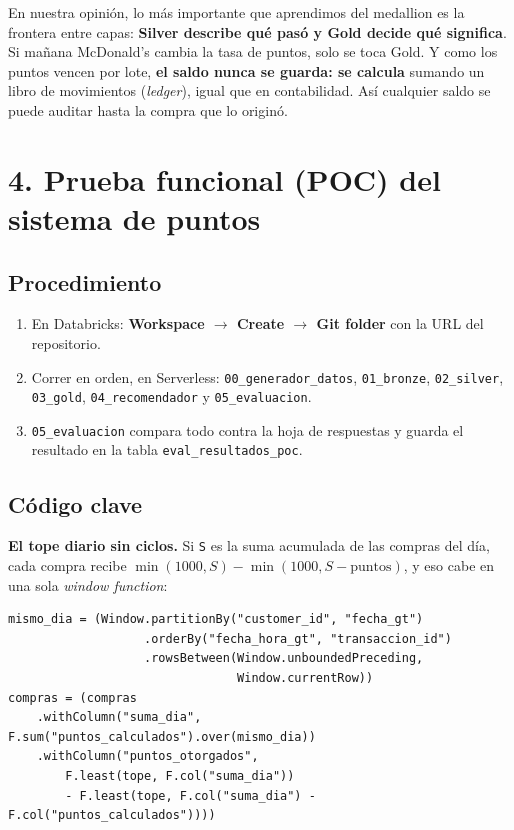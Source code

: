 \documentclass[12pt,a4paper]{article}
\begin{document}
En nuestra opinión, lo más importante que aprendimos del medallion es la frontera entre capas:
\textbf{Silver describe qué pasó y Gold decide qué significa}. Si mañana McDonald's cambia la tasa
de puntos, solo se toca Gold. Y como los puntos vencen por lote, \textbf{el saldo nunca se guarda:
se calcula} sumando un libro de movimientos (\emph{ledger}), igual que en contabilidad. Así
cualquier saldo se puede auditar hasta la compra que lo originó.

\section{4. Prueba funcional (POC) del sistema de puntos}

\subsection{Procedimiento}

\begin{enumerate}[leftmargin=1.4em]
\item En Databricks: \textbf{Workspace $\rightarrow$ Create $\rightarrow$ Git folder} con la URL
del repositorio.
\item Correr en orden, en Serverless: \texttt{00\_generador\_datos}, \texttt{01\_bronze},
\texttt{02\_silver}, \texttt{03\_gold}, \texttt{04\_recomendador} y \texttt{05\_evaluacion}.
\item \texttt{05\_evaluacion} compara todo contra la hoja de respuestas y guarda el resultado en
la tabla \texttt{eval\_resultados\_poc}.
\end{enumerate}

\subsection{Código clave}

\textbf{El tope diario sin ciclos.} Si \texttt{S} es la suma acumulada de las compras del día,
cada compra recibe $\min(1000, S) - \min(1000, S - \mathrm{puntos})$, y eso cabe en una sola
\emph{window function}:

\begin{verbatim}
mismo_dia = (Window.partitionBy("customer_id", "fecha_gt")
                   .orderBy("fecha_hora_gt", "transaccion_id")
                   .rowsBetween(Window.unboundedPreceding,
                                Window.currentRow))
compras = (compras
    .withColumn("suma_dia", F.sum("puntos_calculados").over(mismo_dia))
    .withColumn("puntos_otorgados",
        F.least(tope, F.col("suma_dia"))
        - F.least(tope, F.col("suma_dia") - F.col("puntos_calculados"))))
\end{verbatim}
\end{document}
